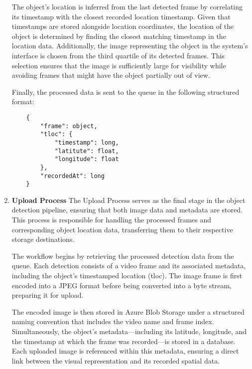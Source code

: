 \begin{enumerate}
    The object's location is inferred from the last detected frame by correlating its timestamp with the closest recorded location timestamp. Given that timestamps are stored alongside location coordinates, the location of the object is determined by finding the closest matching timestamp in the location data. Additionally, the image representing the object in the system's interface is chosen from the third quartile of its detected frames. This selection ensures that the image is sufficiently large for visibility while avoiding frames that might have the object partially out of view.

    Finally, the processed data is sent to the queue in the following structured format:
    \begin{lstlisting}
    {
        "frame": object,
        "tloc": {
            "timestamp": long,
            "latitute": float,
            "longitude": float
        },
        "recordedAt": long
    }
    \end{lstlisting}

    \item\textbf{Upload Process}
    The Upload Process serves as the final stage in the object detection pipeline, ensuring that both image data and metadata are stored. This process is responsible for handling the processed frames and corresponding object location data, transferring them to their respective storage destinations.

    The workflow begins by retrieving the processed detection data from the queue. Each detection consists of a video frame and its associated metadata, including the object's timestamped location (tloc). The image frame is first encoded into a JPEG format before being converted into a byte stream, preparing it for upload.

    The encoded image is then stored in Azure Blob Storage under a structured naming convention that includes the video name and frame index. Simultaneously, the object's metadata—including its latitude, longitude, and the timestamp at which the frame was recorded—is stored in a database. Each uploaded image is referenced within this metadata, ensuring a direct link between the visual representation and its recorded spatial data.
\end{enumerate}
\newcommand{\dir}{chapters/approach/detection}